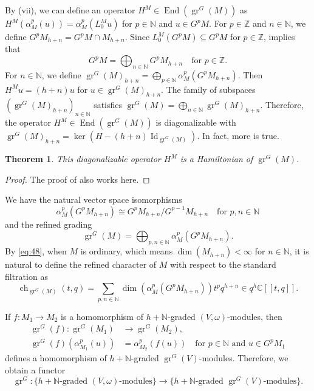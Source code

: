 \documentclass[a4paper, 12pt, reqno]{amsart}
\newtheorem{theorem}{Theorem}[section]
\theoremstyle{remark}
\DeclareMathOperator{\Id}{Id}
\DeclareMathOperator{\gr}{gr}
\DeclareMathOperator{\End}{End}
\DeclareMathOperator{\ch}{ch}
\begin{document}
By (vii), we can define an operator $H^M \in \End(\gr^G(M))$ as $H^M(\alpha_M^p(u)) = \alpha_M^p(L^M_0u)$ for $p \in \mathbb{N}$ and $u \in G^pM$.
For $p \in \mathbb{Z}$ and $n \in \mathbb{N}$, we define $G^pM_{h + n} = G^pM \cap M_{h + n}$.
Since $L_0^M(G^pM) \subseteq G^pM$ for $p \in \mathbb{Z}$,  implies that
\begin{equation*}
  G^pM = \bigoplus_{n \in \mathbb{N}}G^pM_{h + n} \quad \text{for $p \in \mathbb{Z}$}.
\end{equation*}
For $n \in \mathbb{N}$, we define $\gr^G(M)_{h + n} = \bigoplus_{p \in \mathbb{N}}\alpha_M^p(G^pM_{h + n})$.
Then $H^Mu = (h + n)u$ for $u \in \gr^G(M)_{h + n}$.
The family of subspaces $(\gr^G(M)_{h + n})_{n \in \mathbb{N}}$ satisfies $\gr^G(M) = \bigoplus_{n \in \mathbb{N}}\gr^G(M)_{h + n}$.
Therefore, the operator $H^M \in \End(\gr^G(M))$ is diagonalizable with $\gr^G(M)_{h + n} = \ker(H - (h + n)\Id_{\gr^G(M)})$.
In fact, more is true.

\begin{theorem}
  \label{thr:54}
  This diagonalizable operator $H^M$ is a Hamiltonian of $\gr^G(M)$.
\end{theorem}

\begin{proof}
  The proof of  also works here.
\end{proof}

We have the natural vector space isomorphisms
\begin{equation}
  \label{eq:47}
  \alpha_M^p(G^pM_{h + n}) \cong G^pM_{h + n}/G^{p - 1}M_{h + n} \quad \text{for $p, n \in \mathbb{N}$}
\end{equation}
and the refined grading
\begin{equation}
  \label{eq:48}
  \gr^G(M) = \bigoplus_{p, n \in \mathbb{N}}\alpha_M^p(G^pM_{h + n}).
\end{equation}
By \eqref{eq:48}, when $M$ is ordinary, which means $\dim(M_{h + n}) < \infty$ for $n \in \mathbb{N}$, it is natural to define the refined character of $M$ with respect to the standard filtration as
\begin{equation*}
  \ch_{\gr^G(M)}(t, q) = \sum_{p, n \in \mathbb{N}}\dim(\alpha_M^p(G^pM_{h + n}))t^pq^{h + n} \in q^h\mathbb{C}[[t, q]].
\end{equation*}

If $f: M_1 \to M_2$ is a homomorphism of $h + \mathbb{N}$-graded $(V, \omega)$-modules, then
\begin{align*}
  \gr^G(f): \gr^G(M_1) &\to \gr^G(M_2), \\
  \gr^G(f)(\alpha^p_{M_1}(u)) &= \alpha^p_{M_2}(f(u)) \quad \text{for $p \in \mathbb{N}$ and $u \in G^pM_1$}
\end{align*}
defines a homomorphism of $h + \mathbb{N}$-graded $\gr^G(V)$-modules.
Therefore, we obtain a functor
\begin{equation*}
  \gr^G: \{\text{$h + \mathbb{N}$-graded $(V, \omega)$-modules}\} \to \{\text{$h + \mathbb{N}$-graded $\gr^G(V)$-modules}\}.
\end{equation*}
\end{document}
